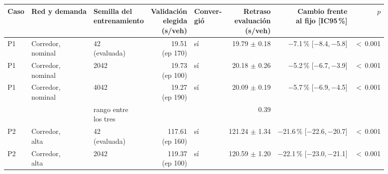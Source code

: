 \begin{table}[H]
\centering
\scriptsize
\setlength{\tabcolsep}{3pt}
\begin{tabular}{lllrlrrr}
\toprule
Caso & Red y demanda & \makecell{Semilla del\\entrenamiento} & \makecell{Validación\\elegida\\(s/veh)} & \makecell{Conver-\\gió} & \makecell{Retraso\\evaluación\\(s/veh)} & \makecell{Cambio frente\\al fijo [IC95\,\%]} & $p$ \\
\midrule
P1 & \makecell[l]{Corredor,\\{}nominal} & \makecell[l]{42\\{}(evaluada)} & \makecell[r]{19.51\\{}(ep 170)} & sí & \makecell[r]{19.79\\{}$\pm$ 0.18} & \makecell[r]{$-$7.1\,\%\\{}[$-$8.4,\,$-$5.8]} & $<$\,0.001 \\
P1 & \makecell[l]{Corredor,\\{}nominal} & 2042 & \makecell[r]{19.73\\{}(ep 100)} & sí & \makecell[r]{20.18\\{}$\pm$ 0.26} & \makecell[r]{$-$5.2\,\%\\{}[$-$6.7,\,$-$3.9]} & $<$\,0.001 \\
P1 & \makecell[l]{Corredor,\\{}nominal} & 4042 & \makecell[r]{19.27\\{}(ep 190)} & sí & \makecell[r]{20.09\\{}$\pm$ 0.19} & \makecell[r]{$-$5.7\,\%\\{}[$-$6.9,\,$-$4.5]} & $<$\,0.001 \\
 & & \makecell[l]{rango entre\\{}los tres} & & & 0.39 & & \\
P2 & \makecell[l]{Corredor,\\{}alta} & \makecell[l]{42\\{}(evaluada)} & \makecell[r]{117.61\\{}(ep 160)} & sí & \makecell[r]{121.24\\{}$\pm$ 1.34} & \makecell[r]{$-$21.6\,\%\\{}[$-$22.6,\,$-$20.7]} & $<$\,0.001 \\
P2 & \makecell[l]{Corredor,\\{}alta} & 2042 & \makecell[r]{119.37\\{}(ep 100)} & sí & \makecell[r]{120.59\\{}$\pm$ 1.20} & \makecell[r]{$-$22.1\,\%\\{}[$-$23.0,\,$-$21.1]} & $<$\,0.001 \\

\end{tabular}
\end{table}
